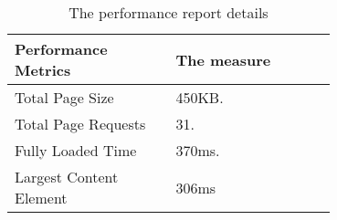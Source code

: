

\begin{table}[!ht]
  \centering
  \caption{The performance report details}
  \begin{tabular}{p{0.35\linewidth} p{0.35\linewidth}}
    \toprule
    Performance Metrics & The measure
    \\\midrule
    Total Page Size & 450KB. \\
    Total Page Requests & 31. \\
    Fully Loaded Time & 370ms. \\
    Largest Content Element & 306ms
    \\\bottomrule
  \end{tabular}
\end{table}